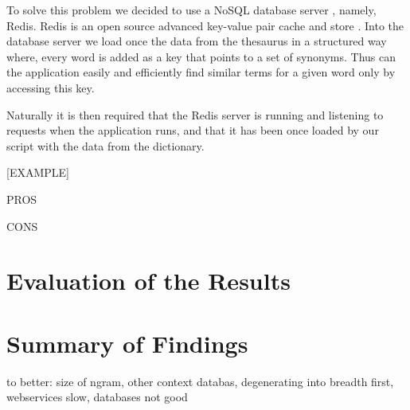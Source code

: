 \documentclass{reportAlternative}
\begin{document}
To solve this problem we decided to use a NoSQL database server \cite{NoSQL}, namely, Redis. Redis is an open source advanced key-value pair cache and store \cite{Redis}. Into the database server we load once the data from the thesaurus in a structured way where, every word is added as a key that points to a set of synonyms. Thus can the application easily and efficiently find similar terms for a given word only by accessing this key.

Naturally it is then required that the Redis server is running and listening to requests when the application runs, and that it has been once loaded by our script with the data from the dictionary.

[EXAMPLE]

PROS

CONS

\chapter{Evaluation of the Results}

\chapter{Summary of Findings}
to better: size of ngram, other context databas, degenerating into breadth first, webservices slow, databases not good
\end{document}
